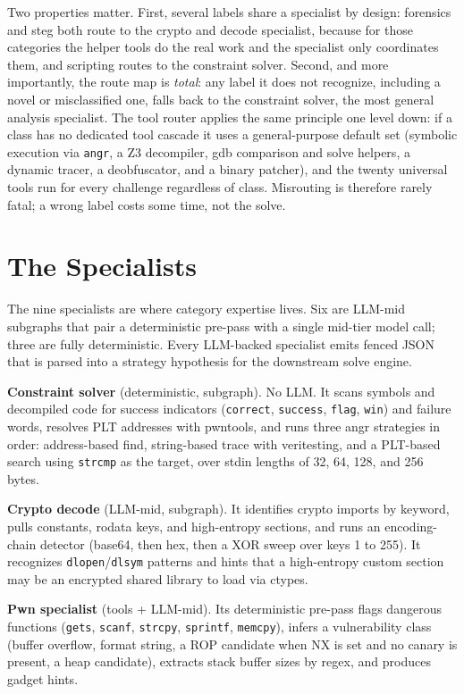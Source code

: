 \documentclass[10pt,twocolumn]{article}
\begin{document}
Two properties matter. First, several labels share a specialist by design: forensics and steg both
route to the crypto and decode specialist, because for those categories the helper tools do the real
work and the specialist only coordinates them, and scripting routes to the constraint solver. Second,
and more importantly, the route map is \emph{total}: any label it does not recognize, including a novel
or misclassified one, falls back to the constraint solver, the most general analysis specialist. The
tool router applies the same principle one level down: if a class has no dedicated tool cascade it uses
a general-purpose default set (symbolic execution via \texttt{angr}, a Z3 decompiler, gdb comparison and
solve helpers, a dynamic tracer, a deobfuscator, and a binary patcher), and the twenty universal tools
run for every challenge regardless of class. Misrouting is therefore rarely fatal; a wrong label costs
some time, not the solve.

\section{The Specialists}
\label{sec:specialists}

The nine specialists are where category expertise lives. Six are LLM-mid subgraphs that pair a
deterministic pre-pass with a single mid-tier model call; three are fully deterministic. Every
LLM-backed specialist emits fenced JSON that is parsed into a strategy hypothesis for the downstream
solve engine.

\medskip
\textbf{Constraint solver} (deterministic, subgraph). No LLM. It scans symbols and decompiled code for
success indicators (\texttt{correct}, \texttt{success}, \texttt{flag}, \texttt{win}) and failure words,
resolves PLT addresses with pwntools, and runs three angr strategies in order: address-based find,
string-based trace with veritesting, and a PLT-based search using \texttt{strcmp} as the target, over
stdin lengths of 32, 64, 128, and 256 bytes.

\medskip
\textbf{Crypto decode} (LLM-mid, subgraph). It identifies crypto imports by keyword, pulls constants,
rodata keys, and high-entropy sections, and runs an encoding-chain detector (base64, then hex, then a
XOR sweep over keys 1 to 255). It recognizes \texttt{dlopen}/\texttt{dlsym} patterns and hints that a
high-entropy custom section may be an encrypted shared library to load via ctypes.

\medskip
\textbf{Pwn specialist} (tools + LLM-mid). Its deterministic pre-pass flags dangerous functions
(\texttt{gets}, \texttt{scanf}, \texttt{strcpy}, \texttt{sprintf}, \texttt{memcpy}), infers a vulnerability
class (buffer overflow, format string, a ROP candidate when NX is set and no canary is present, a heap
candidate), extracts stack buffer sizes by regex, and produces gadget hints.
\end{document}
